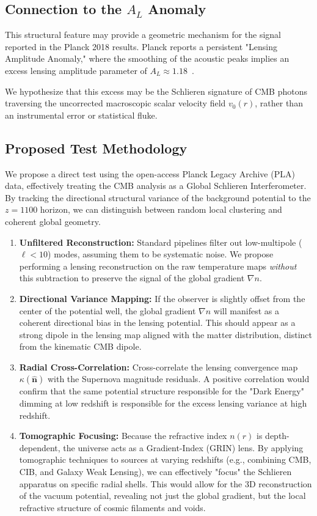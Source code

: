 \documentclass[11pt]{article}
\begin{document}
\subsection{Connection to the $A_L$ Anomaly}
This structural feature may provide a geometric mechanism for the signal reported in the Planck 2018 results. Planck reports a persistent "Lensing Amplitude Anomaly," where the smoothing of the acoustic peaks implies an excess lensing amplitude parameter of $A_L \approx 1.18$~\cite{Planck2018}.

We hypothesize that this excess may be the Schlieren signature of CMB photons traversing the uncorrected macroscopic scalar velocity field $v_0(r)$, rather than an instrumental error or statistical fluke.

\subsection{Proposed Test Methodology}
We propose a direct test using the open-access Planck Legacy Archive (PLA) data, effectively treating the CMB analysis as a Global Schlieren Interferometer. By tracking the directional structural variance of the background potential to the $z=1100$ horizon, we can distinguish between random local clustering and coherent global geometry.

\begin{enumerate}
    \item \textbf{Unfiltered Reconstruction:} Standard pipelines filter out low-multipole ($\ell < 10$) modes, assuming them to be systematic noise. We propose performing a lensing reconstruction on the raw temperature maps \textit{without} this subtraction to preserve the signal of the global gradient $\nabla n$.
    
    \item \textbf{Directional Variance Mapping:} If the observer is slightly offset from the center of the potential well, the global gradient $\nabla n$ will manifest as a coherent directional bias in the lensing potential. This should appear as a strong dipole in the lensing map aligned with the matter distribution, distinct from the kinematic CMB dipole.
    
    \item \textbf{Radial Cross-Correlation:} Cross-correlate the lensing convergence map $\kappa(\hat{\mathbf{n}})$ with the Supernova magnitude residuals. A positive correlation would confirm that the same potential structure responsible for the "Dark Energy" dimming at low redshift is responsible for the excess lensing variance at high redshift.

    \item \textbf{Tomographic Focusing:} Because the refractive index $n(r)$ is depth-dependent, the universe acts as a Gradient-Index (GRIN) lens. By applying tomographic techniques to sources at varying redshifts (e.g., combining CMB, CIB, and Galaxy Weak Lensing), we can effectively "focus" the Schlieren apparatus on specific radial shells. This would allow for the 3D reconstruction of the vacuum potential, revealing not just the global gradient, but the local refractive structure of cosmic filaments and voids.
\end{enumerate}
\end{document}
